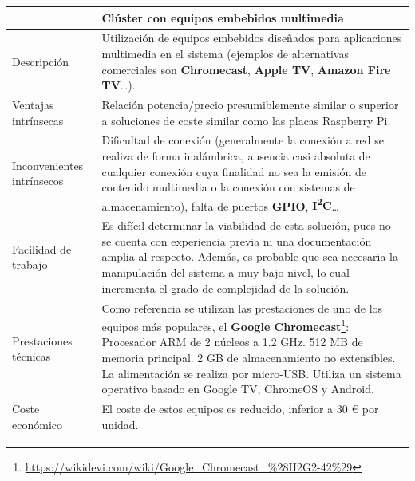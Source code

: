\begin{table}[H]
\begin{tabular}{|p{2.4cm}|p{12cm}|}
\hline
&\textbf{Clúster con equipos embebidos multimedia}\\
\hline
Descripción&Utilización de equipos embebidos diseñados para aplicaciones multimedia en el sistema (ejemplos de alternativas comerciales son \textbf{Chromecast}, \textbf{Apple TV}, \textbf{Amazon Fire TV}\dots).\\
\hline
Ventajas intrínsecas&Relación potencia/precio presumiblemente similar o superior a soluciones de coste similar como las placas Raspberry Pi.\\
\hline
Inconvenientes intrínsecos&Dificultad de conexión (generalmente la conexión a red se realiza de forma inalámbrica, ausencia casi absoluta de cualquier conexión cuya finalidad no sea la emisión de contenido multimedia o la conexión con sistemas de almacenamiento), falta de puertos \textbf{GPIO}, \textbf{I\textsuperscript{2}C}\dots\\
\hline
Facilidad de trabajo&Es difícil determinar la viabilidad de esta solución, pues no se cuenta con experiencia previa ni una documentación amplia al respecto. Además, es probable que sea necesaria la manipulación del sistema a muy bajo nivel, lo cual incrementa el grado de complejidad de la solución.\\
\hline
Prestaciones técnicas&Como referencia se utilizan las prestaciones de uno de los equipos más populares, el \textbf{Google Chromecast}\footnote{\href{https://wikidevi.com/wiki/Google\_Chromecast\_\%28H2G2-42\%29}{https://wikidevi.com/wiki/Google\_Chromecast\_\%28H2G2-42\%29}}: Procesador ARM de 2 núcleos a 1.2 GHz. 512 MB de memoria principal. 2 GB de almacenamiento no extensibles. La alimentación se realiza por micro-USB. Utiliza un sistema operativo basado en Google TV, ChromeOS y Android.
\\
\hline
Coste económico&El coste de estos equipos es reducido, inferior a 30 € por unidad.\\

\end{tabular}
\end{table}

